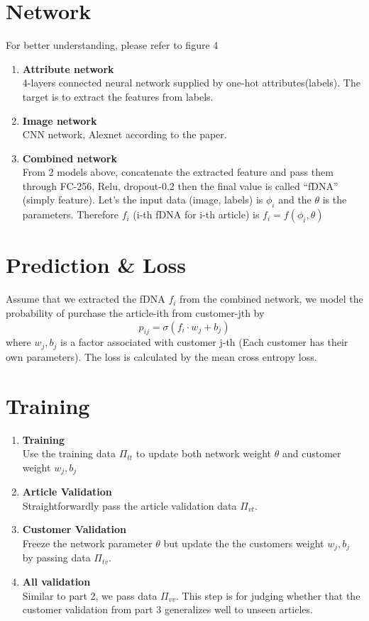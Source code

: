 \documentclass{article}
\begin{document}
\section*{Network}
For better understanding, please refer to figure 4\\
\begin{enumerate}
\item {\bf Attribute network}\\
4-layers connected neural network supplied by one-hot attributes(labels). The target is to extract the features from labels.
\item {\bf Image network}\\
CNN network, Alexnet according to the paper.
\item {\bf Combined network}\\
From 2 models above, concatenate the extracted feature and pass them through FC-256, Relu, dropout-0.2 then the final value is called ``fDNA'' (simply feature). Let's the input data (image, labels) is $\phi_i$ and the $\theta$ is the parameters. Therefore $f_i$ (i-th fDNA for i-th article) is $f_i=f(\phi_i, \theta)$
\end{enumerate}
\section*{Prediction \& Loss}
Assume that we extracted the fDNA $f_i$ from the combined network, we model the probability of purchase the article-ith from customer-jth by
\[p_{ij} = \sigma(f_i\cdot w_{j}+b_j)\]
where $w_j, b_j$ is a factor associated with customer j-th (Each customer has their own parameters).
The loss is calculated by the mean cross entropy loss.
\section*{Training}
\begin{enumerate}
\item {\bf Training}\\
Use the training data $\Pi_{tt}$ to update both network weight $\theta$ and customer weight $w_j, b_j$ 
\item {\bf Article Validation}\\
Straightforwardly pass the article validation data $\Pi_{vt}$.
\item {\bf Customer Validation}\\
Freeze the network parameter $\theta$ but update the the customers weight $w_j, b_j$ by passing data $\Pi_{tv}$.
\item {\bf All validation}\\
Similar to part 2, we pass data $\Pi_{vv}$. This step is for judging whether that the customer validation from part 3 generalizes well to unseen articles.
\end{enumerate}
\end{document}
